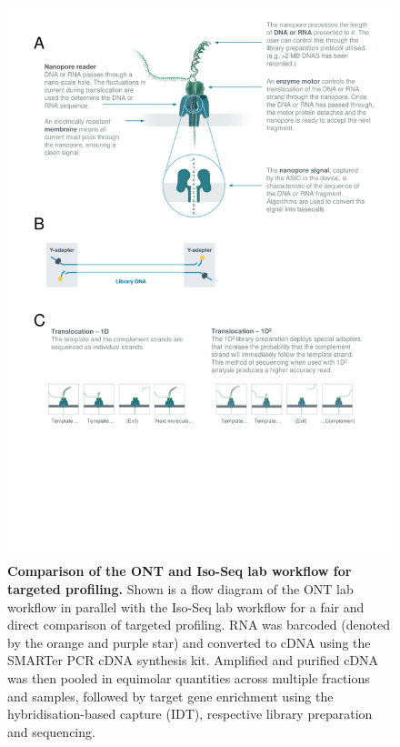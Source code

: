 \begin{figure}[]
	\centering
	\includegraphics[page=7,trim={0 6cm 0 0 },clip, scale = 0.7]{Figures/ProjectDevelopment_FiguresONT}
	\captionsetup{width=0.95\textwidth}
	\caption[Comparison of the ONT and Iso-Seq lab workflow for targeted profiling]%
	{\textbf{Comparison of the ONT and Iso-Seq lab workflow for targeted profiling.} Shown is a flow diagram of the ONT lab workflow in parallel with the Iso-Seq lab workflow for a fair and direct comparison of targeted profiling. RNA was barcoded (denoted by the orange and purple star) and converted to cDNA using the SMARTer PCR cDNA synthesis kit. Amplified and purified cDNA was then pooled in equimolar quantities across multiple fractions and samples, followed by target gene enrichment using the hybridisation-based capture (IDT), respective library preparation and sequencing.}
	\label{fig:ONT_TargetedProtocol}
\end{figure}



